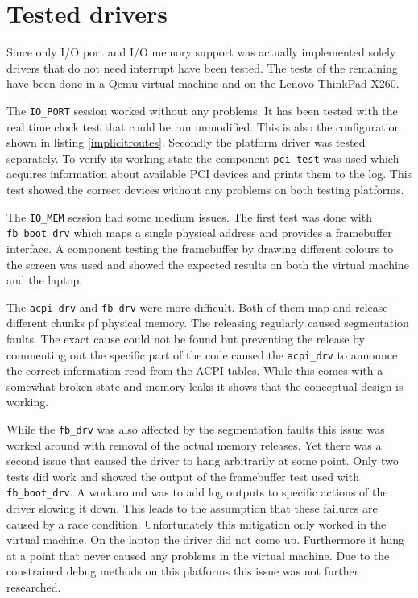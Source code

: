 \documentclass[
a4paper,
12pt,
notitlepage,
parskip=half,
DIV=11,
]{scrbook}
\begin{document}
		\section{Tested drivers}
		
		Since only I/O port and I/O memory support was actually implemented solely drivers that do not need interrupt have been tested.
		The tests of the remaining have been done in a Qemu virtual machine and on the Lenovo ThinkPad X260.
		
		The \texttt{IO\_PORT} session worked without any problems.
		It has been tested with the real time clock test that could be run unmodified.
		This is also the configuration shown in listing \ref{implicitroutes}.
		Secondly the platform driver was tested separately.
		To verify its working state the component \texttt{pci-test} was used which acquires information about available PCI devices and prints them to the log.
		This test showed the correct devices without any problems on both testing platforms.
		
		The \texttt{IO\_MEM} session had some medium issues.
		The first test was done with \texttt{fb\_boot\_drv} which maps a single physical address and provides a framebuffer interface.
		A component testing the framebuffer by drawing different colours to the screen was used and showed the expected results on both the virtual machine and the laptop.
		
		The \texttt{acpi\_drv} and \texttt{fb\_drv} were more difficult.
		Both of them map and release different chunks pf physical memory.
		The releasing regularly caused segmentation faults.
		The exact cause could not be found but preventing the release by commenting out the specific part of the code caused the \texttt{acpi\_drv} to announce the correct information read from the ACPI tables.
		While this comes with a somewhat broken state and memory leaks it shows that the conceptual design is working.
		
		While the \texttt{fb\_drv} was also affected by the segmentation faults this issue was worked around with removal of the actual memory releases.
		Yet there was a second issue that caused the driver to hang arbitrarily at some point.
		Only two tests did work and showed the output of the framebuffer test used with \texttt{fb\_boot\_drv}.
		A workaround was to add log outputs to specific actions of the driver slowing it down.
		This leads to the assumption that these failures are caused by a race condition.
		Unfortunately this mitigation only worked in the virtual machine.
		On the laptop the driver did not come up.
		Furthermore it hung at a point that never caused any problems in the virtual machine.
		Due to the constrained debug methods on this platforms this issue was not further researched.
	
\end{document}
